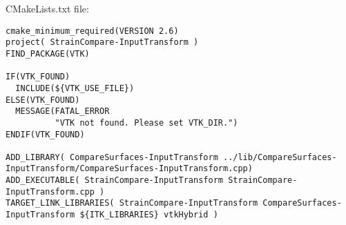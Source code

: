 CMakeLists.txt file:
\begin{lstlisting}
cmake_minimum_required(VERSION 2.6)
project( StrainCompare-InputTransform )
FIND_PACKAGE(VTK)

IF(VTK_FOUND)
  INCLUDE(${VTK_USE_FILE})
ELSE(VTK_FOUND)
  MESSAGE(FATAL_ERROR
          "VTK not found. Please set VTK_DIR.")
ENDIF(VTK_FOUND)

ADD_LIBRARY( CompareSurfaces-InputTransform ../lib/CompareSurfaces-InputTransform/CompareSurfaces-InputTransform.cpp)
ADD_EXECUTABLE( StrainCompare-InputTransform StrainCompare-InputTransform.cpp )
TARGET_LINK_LIBRARIES( StrainCompare-InputTransform CompareSurfaces-InputTransform ${ITK_LIBRARIES} vtkHybrid )
\end{lstlisting}
